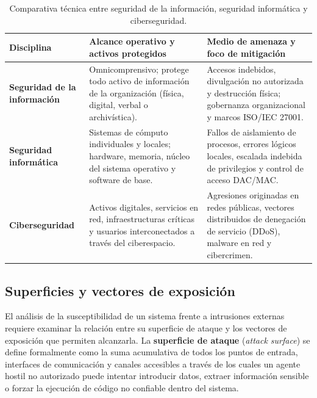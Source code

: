 \documentclass[12pt]{article}
\begin{document}
\begin{table}[htbp]
\centering
\footnotesize
\renewcommand{\arraystretch}{1.1}
\renewcommand{\tabularxcolumn}[1]{m{#1}}
\setlength{\emergencystretch}{1.5em}
\caption{Comparativa técnica entre seguridad de la información, seguridad informática y ciberseguridad.}
\label{tab:comparativaDisciplinasSeguridad}
\begin{tabularx}{\textwidth}{>{\centering\arraybackslash}m{2.5cm} X X}
\toprule
\textbf{Disciplina} & \textbf{Alcance operativo y activos protegidos} & \textbf{Medio de amenaza y foco de mitigación} \\
\midrule
\textbf{Seguridad de la información} & Omnicomprensivo; protege todo activo de información de la organización (física, digital, verbal o archivística). & Accesos indebidos, divulgación no autorizada y destrucción física; gobernanza organizacional y marcos ISO/IEC 27001. \\
\addlinespace
\textbf{Seguridad informática} & Sistemas de cómputo individuales y locales; hardware, memoria, núcleo del sistema operativo y software de base. & Fallos de aislamiento de procesos, errores lógicos locales, escalada indebida de privilegios y control de acceso DAC/MAC. \\
\addlinespace
\textbf{Ciberseguridad} & Activos digitales, servicios en red, infraestructuras críticas y usuarios interconectados a través del ciberespacio. & Agresiones originadas en redes públicas, vectores distribuidos de denegación de servicio (DDoS), malware en red y cibercrimen. \\
\bottomrule
\end{tabularx}
\end{table}

\subsection{Superficies y vectores de exposición}\label{subsec:superficiesVectoresExposicion}

El análisis de la susceptibilidad de un sistema frente a intrusiones externas requiere examinar la relación entre su superficie de ataque y los vectores de exposición que permiten alcanzarla. La \textbf{superficie de ataque} (\textit{attack surface}) se define formalmente como la suma acumulativa de todos los puntos de entrada, interfaces de comunicación y canales accesibles a través de los cuales un agente hostil no autorizado puede intentar introducir datos, extraer información sensible o forzar la ejecución de código no confiable dentro del sistema.
\end{document}
